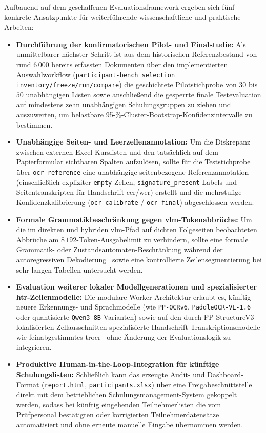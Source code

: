 Aufbauend auf dem geschaffenen Evaluationsframework ergeben sich fünf konkrete Ansatzpunkte für weiterführende wissenschaftliche und praktische Arbeiten:
\begin{itemize}
  \item \textbf{Durchführung der konfirmatorischen Pilot- und Finalstudie:} Als unmittelbarer nächster Schritt ist aus dem historischen Referenzbestand von rund $6\,000$ bereits erfassten Dokumenten über den implementierten Auswahlworkflow (\texttt{participant-bench selection inventory/freeze/run/compare}) die geschichtete Pilotstichprobe von $30$ bis $50$ unabhängigen Listen sowie anschließend die gesperrte finale Testevaluation auf mindestens zehn unabhängigen Schulungsgruppen zu ziehen und auszuwerten, um belastbare 95-\%-Cluster-Bootstrap-Konfidenzintervalle zu bestimmen.
  \item \textbf{Unabhängige Seiten- und Leerzellenannotation:} Um die Diskrepanz zwischen externen Excel-Kurslisten und den tatsächlich auf dem Papierformular sichtbaren Spalten aufzulösen, sollte für die Teststichprobe über \texttt{ocr-reference} eine unabhängige seitenbezogene Referenzannotation (einschließlich expliziter \texttt{empty}-Zellen, \texttt{signature\_present}-Labels und Seitentranskripten für Handschrift-\ac{cer}/\ac{wer}) erstellt und die mehrstufige Konfidenzkalibrierung (\texttt{ocr-calibrate} / \texttt{ocr-final}) abgeschlossen werden.
  \item \textbf{Formale Grammatikbeschränkung gegen \ac{vlm}-Tokenabbrüche:} Um die im direkten und hybriden \ac{vlm}-Pfad auf dichten Folgeseiten beobachteten Abbrüche am $8\,192$-Token-Ausgabelimit zu verhindern, sollte eine formale Grammatik- oder Zustandsautomaten-Beschränkung während der autoregressiven Dekodierung~\cite{Geng2023Grammar} sowie eine kontrollierte Zeilensegmentierung bei sehr langen Tabellen untersucht werden.
  \item \textbf{Evaluation weiterer lokaler Modellgenerationen und spezialisierter \ac{htr}-Zeilenmodelle:} Die modulare Worker-Architektur erlaubt es, künftig neuere Erkennungs- und Sprachmodelle (wie \texttt{PP-OCRv6}, \texttt{PaddleOCR-VL-1.6} oder quantisierte \texttt{Qwen3-8B}-Varianten) sowie auf den durch PP-StructureV3 lokalisierten Zellausschnitten spezialisierte Handschrift-Transkriptionsmodelle wie feinabgestimmtes \ac{trocr}~\cite{Li2023TrOCR} ohne Änderung der Evaluationslogik zu integrieren.
  \item \textbf{Produktive Human-in-the-Loop-Integration für künftige Schulungslisten:} Schließlich kann das erzeugte Audit- und Dashboard-Format (\texttt{report.html}, \texttt{participants.xlsx}) über eine Freigabeschnittstelle direkt mit dem betrieblichen Schulungsmanagement-System gekoppelt werden, sodass bei künftig eingehenden Teilnehmerlisten die vom Prüfpersonal bestätigten oder korrigierten Teilnehmerdatensätze automatisiert und ohne erneute manuelle Eingabe übernommen werden.
\end{itemize}
